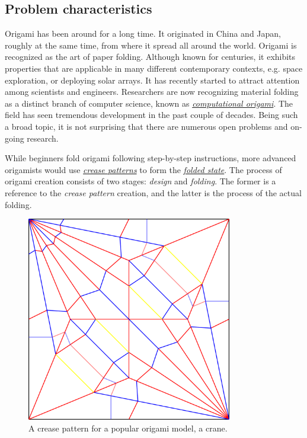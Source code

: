 \subsection{Problem characteristics}
Origami has been around for a long time. It originated in China and Japan, roughly at the same time, from where it 
spread all around the world\cite{wiki:history-of-origami}. 
Origami is recognized as the art of paper folding.
Although known for centuries, it exhibits properties that are applicable 
in many different contemporary contexts, e.g.
space exploration\cite{origami-in-orbit}, or deploying solar arrays\cite{solar-panel-origami}.
It has recently started to attract attention among scientists and engineers.
Researchers are now recognizing material folding as a distinct
branch of computer science, known as \hyperref[dictionary:computational-origami]{\textit{computational origami}}.
The field has seen tremendous development in the past couple of decades.
Being such a broad topic, it is not surprising that there are numerous open problems\cite{mit-open-problems} and on-going research.

\medskip

While beginners fold origami following step-by-step instructions,
more advanced origamists would use \hyperref[dictionary:crease-pattern]{\textit{crease patterns}}
to form the \hyperref[dictionary:folded-state]{\textit{folded state}}.
The process of origami creation consists of two stages: \textit{design} and \textit{folding}.
The former is a reference to the \textit{crease pattern} creation, and the latter is the process of the actual folding.

\begin{figure}[H]
\caption{A crease pattern for a popular origami model, a crane.\label{fig:creasepattern}}
  \centering
    \includegraphics[width=0.8\textwidth]{assets/crane-crease-pattern.png}
\end{figure}

